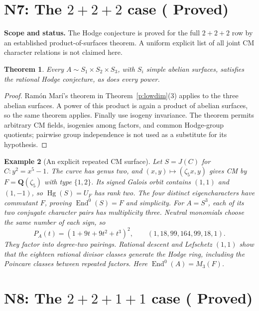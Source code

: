 \documentclass[10pt,reqno]{article}
\theoremstyle{emphasizedplain}
\DeclareRobustCommand{\provedstatus}{%
  \texorpdfstring{\textcolor{ProvedGreen}{\textbf{Proved}}}{Proved}}
\newtheorem{theorem}{Theorem}[section]
\theoremstyle{emphasizeddefinition}
\newtheorem{example}[theorem]{Example}
\theoremstyle{emphasizeddefinition}
\DeclareMathOperator{\End}{End}
\DeclareMathOperator{\Hg}{Hg}
\newcommand{\Q}{\mathbf Q}
\newcommand{\status}[1]{%
  \par\nobreak\smallskip\noindent
  {\setlength{\fboxsep}{7pt}%
   \colorbox{ScopeBackground}{%
    \parbox{\dimexpr\linewidth-2\fboxsep\relax}{%
     \small\textbf{\textcolor{HeadingInk}{Scope and status.}} #1}}}%
  \par\nobreak\medskip}
\renewcommand{\small}{\fontsize{8.4}{10}\selectfont}
\begin{document}
\section{N7: The \texorpdfstring{$2+2+2$}{2+2+2} case (\provedstatus)}\label{sec:N7}

\status{The Hodge conjecture is proved for the full $2+2+2$ row by
an established product-of-surfaces theorem. A uniform explicit list of
all joint CM character relations is not claimed here.}
\begin{theorem}
Every $A\sim S_1\times S_2\times S_3$, with $S_i$ simple abelian
surfaces, satisfies the rational Hodge conjecture, as does every power.
\end{theorem}
\begin{proof}
Ram\'on Mar\'i's theorem in Theorem~\ref{p:lowdim}(3) applies to the
three abelian surfaces. A power of this product is again a product of
abelian surfaces, so the same theorem applies. Finally use isogeny
invariance. The theorem permits arbitrary CM fields, isogenies among
factors, and common Hodge-group quotients; pairwise group independence
is not used as a substitute for its hypothesis.
\end{proof}
\begin{example}[An explicit repeated CM surface]\label{ex:CMsurface}
Let $S=J(C)$ for $C:y^2=x^5-1$. The curve has genus two, and
$(x,y)\mapsto(\zeta_5x,y)$ gives CM by $F=\Q(\zeta_5)$ with type
$\{1,2\}$. Its signed Galois orbit contains $(1,1)$ and $(1,-1)$,
so $\Hg(S)=U_F$ has rank two. The four distinct eigencharacters have
commutant $F$, proving $\End^0(S)=F$ and simplicity.
For $A=S^3$, each of its two conjugate character pairs has multiplicity
three. Neutral monomials choose the same number of each sign, so
\[
 P_A(t)=(1+9t+9t^2+t^3)^2,
 \qquad (1,18,99,164,99,18,1).
\]
They factor into degree-two pairings. Rational descent and Lefschetz
$(1,1)$ show that the eighteen rational divisor classes generate the
Hodge ring, including the Poincare classes between repeated factors.
Here $\End^0(A)=M_3(F)$.
\end{example}
\section{N8: The \texorpdfstring{$2+2+1+1$}{2+2+1+1} case (\provedstatus)}\label{sec:N8}
\end{document}
